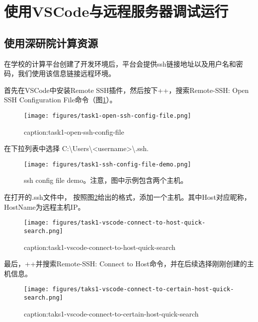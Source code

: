 \section{使用VSCode与远程服务器调试运行}

\subsection{使用深研院计算资源}\label{subsec:task1-vscode-using-sigs-resources}
在学校的计算平台创建了开发环境后，平台会提供ssh链接地址以及用户名和密码，我们使用该信息链接远程环境。

首先在VSCode中安装Remote SSH插件，然后按下++，搜索Remote-SSH: Open SSH Configuration File命令（图\ref{fig:task1-open-ssh-config-file}）。
\begin{figure}[htbp]
	\centering
	\texttt{[image: figures/task1-open-ssh-config-file.png]}
	\caption{caption:task1-open-ssh-config-file}
	\label{fig:task1-open-ssh-config-file}
\end{figure}

在下拉列表中选择 C:\textbackslash Users\textbackslash <username>\textbackslash .ssh.

\begin{figure}[htbp]
	\centering
	\texttt{[image: figures/task1-ssh-config-file-demo.png]}
	\caption{ssh config file demo。注意，图中示例包含两个主机。}
	\label{fig:task1-ssh-config-file-demo}
\end{figure}

在打开的.ssh文件中， 按照图\ref*{fig:task1-ssh-config-file-demo}给出的格式，添加一个主机。其中Host对应昵称，HostName为远程主机IP。

\begin{figure}[htbp]
	\centering
	\texttt{[image: figures/task1-vscode-connect-to-host-quick-search.png]}
	\caption{caption:task1-vscode-connect-to-host-quick-search}
	\label{fig:task1-vscode-connect-to-host-quick-search}
\end{figure}

最后，++并搜索Remote-SSH: Connect to Host命令，并在后续选择刚刚创建的主机信息。

\begin{figure}[htbp]
	\centering
	\texttt{[image: figures/taks1-vscode-connect-to-certain-host-quick-search.png]}
	\caption{caption:taks1-vscode-connect-to-certain-host-quick-search}
	\label{fig:taks1-vscode-connect-to-certain-host-quick-search}
\end{figure}

